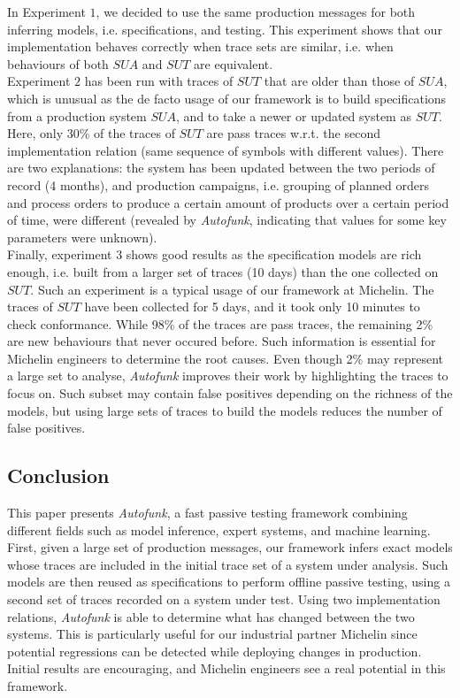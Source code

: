 In Experiment $1$, we decided to use the same production messages
for both inferring models, i.e. specifications, and testing. This
experiment shows that our implementation
behaves correctly when trace sets are similar, i.e. when
behaviours of both $\mathit{SUA}$ and $\mathit{SUT}$ are equivalent.\\
Experiment $2$ has been run with traces of $\mathit{SUT}$ that are older
than those of $\mathit{SUA}$, which is unusual as the de facto usage of
our framework is to build specifications from a production system
$\mathit{SUA}$, and to take a newer or updated system as $\mathit{SUT}$.
Here, only 30\% of the traces of $\mathit{SUT}$ are pass traces w.r.t.
the second implementation relation (same sequence of symbols with
different values). There are two explanations: the system has
been updated between the two periods of record (4 months), and
production campaigns, i.e. grouping of planned orders and process
orders to produce a certain amount of products over a certain
period of time, were different (revealed by \textit{Autofunk},
indicating that values for some key parameters were unknown).\\
Finally, experiment $3$ shows good results as the specification
models are rich enough, i.e.  built from a larger set of traces
(10 days) than the one collected on $\mathit{SUT}$. Such an experiment
is a typical usage of our framework at Michelin.
The traces of $\mathit{SUT}$ have been collected for 5 days, and
it took only 10 minutes to check conformance. While 98\% of the
traces are pass traces, the remaining 2\% are new behaviours that
never occured before. Such information is essential for Michelin
engineers to determine the root causes. Even though 2\% may
represent a large set to analyse, \textit{Autofunk} improves
their work by highlighting the traces to focus on.
Such subset may contain false positives depending on the
richness of the models, but using large sets of traces to build
the models reduces the number of false positives.


\subsection{Conclusion}
\label{sec:conclusion}

This paper presents \textit{Autofunk}, a fast passive testing
framework combining different fields such as model inference,
expert systems, and machine learning. First, given a large set of
production messages, our framework infers exact models whose
traces are included in the initial trace set of a system under
analysis. Such models are then reused as specifications to
perform offline passive testing, using a second set of traces
recorded on a system under test. Using two implementation relations,
\textit{Autofunk} is able to determine what has changed between
the two systems. This is particularly useful for our industrial
partner Michelin since potential regressions can be detected
while deploying changes in production. Initial results are
encouraging, and Michelin engineers see a real potential in this
framework.

